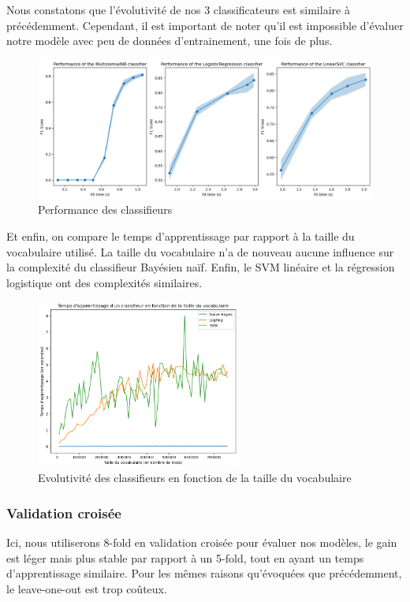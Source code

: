 \documentclass{article}
\begin{document}
Nous constatons que l'évolutivité de nos 3 classificateurs est similaire à précédemment. Cependant, il est important de noter qu'il est impossible d'évaluer notre modèle avec peu de données d'entrainement, une fois de plus.

\begin{figure}[H]
    \centering
    \includegraphics[width=\textwidth]{./src/movies/complexity_analysis_accuracy.png} 
    \caption{Performance des classifieurs}
    \label{complexity_analysis_accuracy_movies}
\end{figure}

Et enfin, on compare le temps d'apprentissage par rapport à la taille du vocabulaire utilisé. La taille du vocabulaire n'a de nouveau aucune influence sur la complexité du classifieur Bayésien naïf. Enfin, le SVM linéaire et la régression logistique ont des complexités similaires.

\begin{figure}[H]
    \centering
    \includegraphics[width=0.6\textwidth]{./src/movies/complexity_analysis_vocabulary.png} 
    \caption{Evolutivité des classifieurs en fonction de la taille du vocabulaire}
    \label{complexity_analysis_vocabulary_movies}
\end{figure}

\subsubsection{Validation croisée}
Ici, nous utiliserons 8-fold en validation croisée pour évaluer nos modèles, le gain est léger mais plus stable par rapport à un 5-fold, tout en ayant un temps d'apprentissage similaire. Pour les mêmes raisons qu'évoquées que précédemment, le leave-one-out est trop coûteux.
\end{document}
